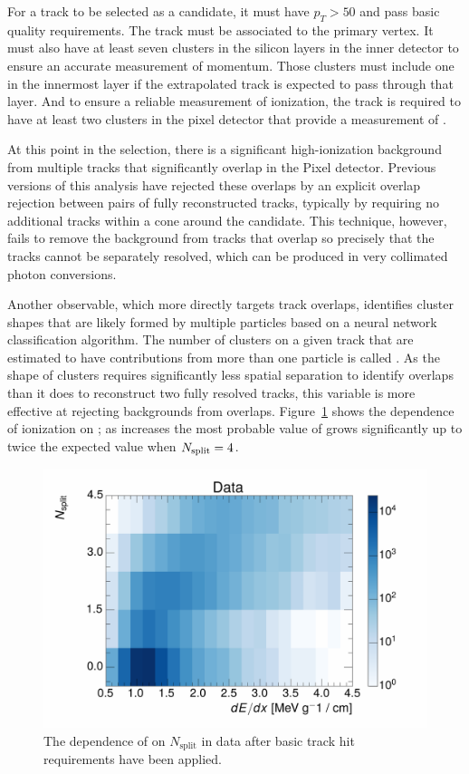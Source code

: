 For a track to be selected as a candidate, it must have $p_T > 50$ \GeV and pass basic quality requirements. 
The track must be associated to the primary vertex.
It must also have at least seven clusters in the silicon layers in the inner detector to ensure an accurate measurement of momentum.
Those clusters must include one in the innermost layer if the extrapolated track is expected to pass through that layer.
And to ensure a reliable measurement of ionization, the track is required to have at least two clusters in the pixel detector that provide a measurement of \dedx.

At this point in the selection, there is a significant high-ionization background from multiple tracks that significantly overlap in the Pixel detector. 
Previous versions of this analysis have rejected these overlaps by an explicit overlap rejection between pairs of fully reconstructed tracks, typically by requiring no additional tracks within a cone around the candidate. 
This technique, however, fails to remove the background from tracks that overlap so precisely that the tracks cannot be separately resolved, which can be produced in very collimated photon conversions.

Another observable, which more directly targets track overlaps, identifies cluster shapes that are likely formed by multiple particles based on a neural network classification algorithm.
The number of clusters on a given track that are estimated to have contributions from more than one particle is called \Nsplit.
As the shape of clusters requires significantly less spatial separation to identify overlaps than it does to reconstruct two fully resolved tracks, this variable is more effective at rejecting backgrounds from overlaps.
Figure~\ref{fig:dedx_nsplit} shows the dependence of ionization on \Nsplit; as \Nsplit increases the most probable value of \dedx grows significantly up to twice the expected value when $N_{\mathrm{split}} = 4$. 

\begin{figure}[h]
\centering
\includegraphics[width=\fullfig]{figures/dedx_nsplit_data.pdf}
\caption{The dependence of \dedx on $N_{\mathrm{split}}$ in data after basic track hit requirements have been applied.}
\label{fig:dedx_nsplit}
\end{figure}

